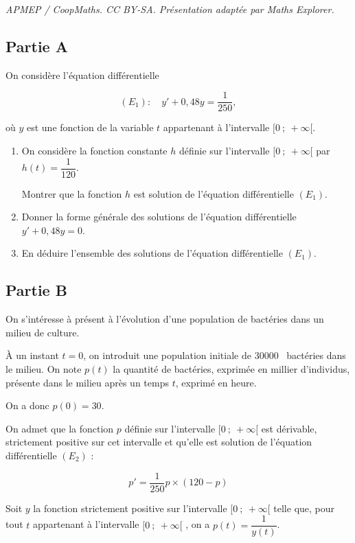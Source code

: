 \documentclass[10pt]{article}
\providecommand{\np}[2][]{{#2~#1}}
\begin{document}
\noindent\textit{APMEP / CoopMaths. CC BY-SA. Présentation adaptée par Maths Explorer.}\par\medskip
\subsection*{Partie A}

On considère l'équation différentielle 

\[(E_1) :\quad  y' + 0{,}48y = \dfrac{1}{250},\]

où $y$ est une fonction de la variable $t$ appartenant à l'intervalle $[0~;~ +\infty[$.

\begin{enumerate}
\item On considère la fonction constante $h$ définie sur l'intervalle $[0~;~ +\infty[$ par $h(t) = \dfrac{1}{120}$.

Montrer que la fonction $h$ est solution de l'équation différentielle $(E_1)$.
\item Donner la forme générale des solutions de l'équation différentielle $y' + 0,48y = 0$.
\item En déduire l'ensemble des solutions de l'équation différentielle $(E_1)$.
\end{enumerate}

\subsection*{Partie B}

On s'intéresse à présent à l'évolution d'une population de bactéries dans un milieu de culture.

À un instant $t = 0$, on introduit une population initiale de \np{30000} bactéries dans le milieu. On note $p(t)$ la quantité de bactéries, exprimée en millier d'individus, présente dans le milieu après un temps $t$, exprimé en heure.

On a donc $p(0) = 30$.

On admet que la fonction $p$ définie sur l'intervalle $[0~;~ +\infty[$ est dérivable, strictement positive sur cet intervalle et qu'elle est solution de l'équation différentielle $(E_2)$ :

\[p' = \dfrac{1}{250}p \times (120 - p)\]

Soit $y$ la fonction strictement positive sur l'intervalle $[0~;~ +\infty[$ telle que, pour tout $t$ appartenant à l'intervalle $[0~;~ +\infty[$ , on a $p(t) = \dfrac{1}{y(t)}$.

\medskip
\end{document}
